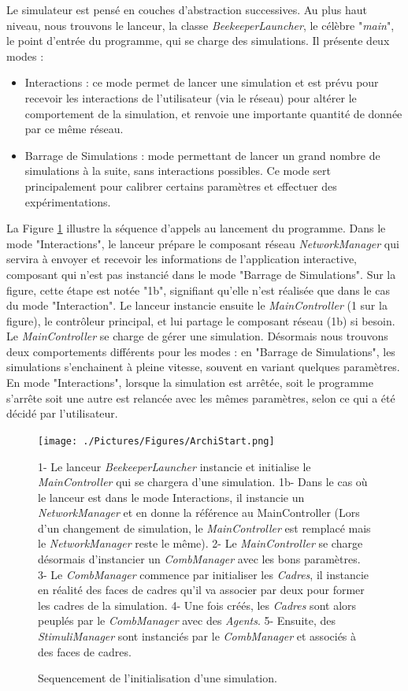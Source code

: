 			Le simulateur est pensé en couches d'abstraction successives. Au plus haut niveau, nous trouvons le lanceur, la classe \textit{BeekeeperLauncher}, le célèbre "\textit{main}", le point d'entrée du programme, qui se charge des simulations. Il présente deux modes :
	\begin{itemize}
		\item Interactions : ce mode permet de lancer une simulation et est prévu pour recevoir les interactions de l'utilisateur (via le réseau) pour altérer le comportement de la simulation, et renvoie une importante quantité de donnée par ce même réseau.
		\item Barrage de Simulations : mode permettant de lancer un grand nombre de simulations à la suite, sans interactions possibles. Ce mode sert principalement pour calibrer certains paramètres et effectuer des expérimentations.
	\end{itemize}				
			
			 La Figure \ref{ArchiStart} illustre la séquence d'appels au lancement du programme. Dans le mode "Interactions", le lanceur prépare le composant réseau \textit{NetworkManager} qui servira à envoyer et recevoir les informations de l'application interactive, composant qui n'est pas instancié dans le mode "Barrage de Simulations". Sur la figure, cette étape est notée "1b", signifiant qu'elle n'est réalisée que dans le cas du mode "Interaction". Le lanceur instancie ensuite le \textit{MainController} (1 sur la figure), le contrôleur principal, et lui partage le composant réseau (1b) si besoin. Le \textit{MainController} se charge de gérer une simulation. Désormais nous trouvons deux comportements différents pour les modes : en "Barrage de Simulations", les simulations s'enchainent à pleine vitesse, souvent en variant quelques paramètres. En mode "Interactions", lorsque la simulation est arrêtée, soit le programme s'arrête soit une autre est relancée avec les mêmes paramètres, selon ce qui a été décidé par l'utilisateur.
			 
			\begin{figure}
			\centering
			\texttt{[image: ./Pictures/Figures/ArchiStart.png]}
			\caption{Sequencement de l'initialisation d'une simulation.}{1- Le lanceur \textit{BeekeeperLauncher} instancie et initialise le \textit{MainController} qui se chargera d'une simulation. 1b- Dans le cas où le lanceur est dans le mode Interactions, il instancie un \textit{NetworkManager} et en donne la référence au MainController (Lors d'un changement de simulation, le \textit{MainController} est remplacé mais le \textit{NetworkManager} reste le même). 2- Le \textit{MainController} se charge désormais d'instancier un \textit{CombManager} avec les bons paramètres. 3- Le \textit{CombManager} commence par initialiser les \textit{Cadres}, il instancie en réalité des faces de cadres qu'il va associer par deux pour former les cadres de la simulation. 4- Une fois créés, les \textit{Cadres} sont alors peuplés par le \textit{CombManager} avec des \textit{Agents}. 5- Ensuite, des \textit{StimuliManager} sont instanciés par le \textit{CombManager} et associés à des faces de cadres.}
			\label{ArchiStart}
			\end{figure}
			

